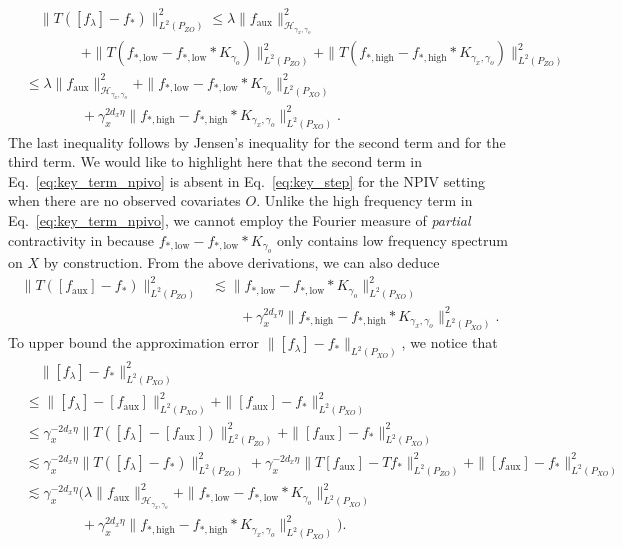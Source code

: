 \documentclass[11pt]{article}
\newcommand{\calH}{\mathcal{H}}
\newcommand{\0}{\mathbf{0}}
\begin{document}
\begin{align}
    &\quad \|T([f_{\lambda}] - f_{\ast})\|^2_{L^2(P_{ZO})} \leq \lambda \|f_{\mathrm{aux}}\|^2_{\calH_{\gamma_x,\gamma_o}} \nonumber \\
    &\qquad\qquad + \|T(f_{\ast, \mathrm{low}} - f_{\ast,\mathrm{low}} \ast K_{\gamma_o})\|_{L^2(P_{ZO})}^2 + \|T(f_{\ast, \mathrm{high}} - f_{\ast,\mathrm{high}} \ast K_{\gamma_x,\gamma_o})\|_{L^2(P_{ZO})}^2 \label{eq:key_term_npivo}  \\
    &\leq \lambda \|f_{\mathrm{aux}}\|^2_{\calH_{\gamma_x,\gamma_o}} + \|f_{\ast, \mathrm{low}} - f_{\ast,\mathrm{low}} \ast K_{\gamma_o}\|_{L^2(P_{XO})}^2 \nonumber \\
    &\qquad\qquad + \gamma_x^{2d_x\eta}\|f_{\ast, \mathrm{high}} - f_{\ast,\mathrm{high}} \ast K_{\gamma_x,\gamma_o}\|_{L^2(P_{XO})}^2. \nonumber 
\end{align}
The last inequality follows by Jensen's inequality for the second term and  for the third term. 
We would like to highlight here that the second term in Eq.~\eqref{eq:key_term_npivo} is absent in Eq.~\eqref{eq:key_step} for the NPIV setting when there are no observed covariates $O$. Unlike the high frequency term in Eq.~\eqref{eq:key_term_npivo}, we cannot employ the Fourier measure of \emph{partial} contractivity in  because $f_{\ast, \mathrm{low}} - f_{\ast,\mathrm{low}} \ast K_{\gamma_o}$ only contains low frequency spectrum on $X$ by construction.
From the above derivations, we can also deduce 
\begin{align*}
    \|T([f_{\mathrm{aux}}] - f_{\ast})\|^2_{L^2(P_{ZO})} &\lesssim \|f_{\ast, \mathrm{low}} - f_{\ast,\mathrm{low}} \ast K_{\gamma_o}\|_{L^2(P_{XO})}^2 \\
    &\qquad + \gamma_x^{2d_x\eta}\|f_{\ast, \mathrm{high}} - f_{\ast,\mathrm{high}} \ast K_{\gamma_x,\gamma_o}\|_{L^2(P_{XO})}^2 .
\end{align*}
To upper bound the approximation error $\|[f_{\lambda}] - f_{\ast}\|_{L^2(P_{XO})}$, we notice that 
\begin{align*}
    &\quad \|[f_{\lambda}] - f_{\ast}\|_{L^2(P_{XO})}^2 \\
    &\leq \|[f_{\lambda}] - [f_{\mathrm{aux}}]\|^2_{L^2(P_{XO})} + \|[f_{\mathrm{aux}}] - f_{\ast}\|^2_{L^2(P_{XO})} \\
    &\leq \gamma_x^{-2d_x\eta} \|T([f_{\lambda}] - [f_{\mathrm{aux}}])\|_{L^2(P
    _{ZO})}^2 + \|[f_{\mathrm{aux}}] - f_{\ast}\|_{L^2(P_{XO})}^2 \\
    &\lesssim \gamma_{x}^{-2d_x\eta} \|T([f_{\lambda}] - f_{\ast})\|^2_{L^2(P_{ZO})} + \gamma_{x}^{-2d_x\eta} \|T [f_{\mathrm{aux}}] - T f_{\ast}\|^2_{L^2(P_{ZO})} + \|[f_{\mathrm{aux}}] - f_{\ast}\|^2_{L^2(P_{XO})} \\
    &\lesssim \gamma_{x}^{-2d_x\eta} \Big( \lambda \|f_{\mathrm{aux}}\|^2_{\calH_{\gamma_x,\gamma_o}} + \|f_{\ast, \mathrm{low}} - f_{\ast,\mathrm{low}} \ast K_{\gamma_o}\|_{L^2(P_{XO})}^2 \\
    &\qquad\qquad + \gamma_x^{2d_x\eta}\|f_{\ast, \mathrm{high}} - f_{\ast,\mathrm{high}} \ast K_{\gamma_x,\gamma_o}\|_{L^2(P_{XO})}^2 \Big) .
\end{align*}
\end{document}
